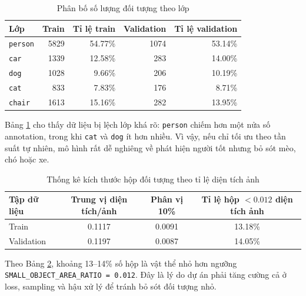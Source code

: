 \documentclass[12pt,a4paper]{article}
\begin{document}
\begin{table}[H]
\centering
\caption{Phân bố số lượng đối tượng theo lớp}
\label{tab:class-counts}
\begin{tabular}{lrrrr}
\toprule
Lớp & Train & Tỉ lệ train & Validation & Tỉ lệ validation \\
\midrule
\texttt{person} & 5829 & 54.77\% & 1074 & 53.14\% \\
\texttt{car} & 1339 & 12.58\% & 283 & 14.00\% \\
\texttt{dog} & 1028 & 9.66\% & 206 & 10.19\% \\
\texttt{cat} & 833 & 7.83\% & 176 & 8.71\% \\
\texttt{chair} & 1613 & 15.16\% & 282 & 13.95\% \\
\bottomrule
\end{tabular}
\end{table}

Bảng \ref{tab:class-counts} cho thấy dữ liệu bị lệch lớp khá rõ: \texttt{person} chiếm hơn một nửa số annotation, trong khi \texttt{cat} và \texttt{dog} ít hơn nhiều. Vì vậy, nếu chỉ tối ưu theo tần suất tự nhiên, mô hình rất dễ nghiêng về phát hiện người tốt nhưng bỏ sót mèo, chó hoặc xe.

\begin{table}[H]
\centering
\caption{Thống kê kích thước hộp đối tượng theo tỉ lệ diện tích ảnh}
\label{tab:size-stats}
\begin{tabular}{lccc}
\toprule
Tập dữ liệu & Trung vị diện tích/ảnh & Phân vị 10\% & Tỉ lệ hộp $< 0.012$ diện tích ảnh \\
\midrule
Train & 0.1117 & 0.0091 & 13.18\% \\
Validation & 0.1197 & 0.0087 & 14.05\% \\
\bottomrule
\end{tabular}
\end{table}

Theo Bảng \ref{tab:size-stats}, khoảng 13--14\% số hộp là vật thể nhỏ hơn ngưỡng \texttt{SMALL\_OBJECT\_AREA\_RATIO = 0.012}. Đây là lý do dự án phải tăng cường cả ở loss, sampling và hậu xử lý để tránh bỏ sót đối tượng nhỏ.
\end{document}
